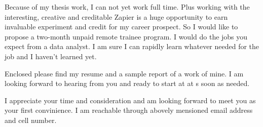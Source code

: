 \documentclass[11pt,a4paper,sans]{moderncv}        %
\begin{document}
Because of my thesis work, I can not yet work full time.  Plus working with the interesting, creative and creditable Zapier is a huge opportunity to earn invaluable experiment and credit for my career prospect. So I would like to propose a two-month unpaid remote trainee program. I would do the jobs you expect from a data analyst. I am sure I can rapidly learn whatever needed for the job and I haven't learned yet.

Enclosed please find my resume and a sample report of a work of mine. I am looking forward to hearing from you and ready to start at at s soon as needed.

 I appreciate your time and consideration and am looking forward to meet you as your first convinience. I am reachable through abovely mensioned email address and cell number.
 \vspace{3mm}
 
\makeletterclosing
\end{document}
